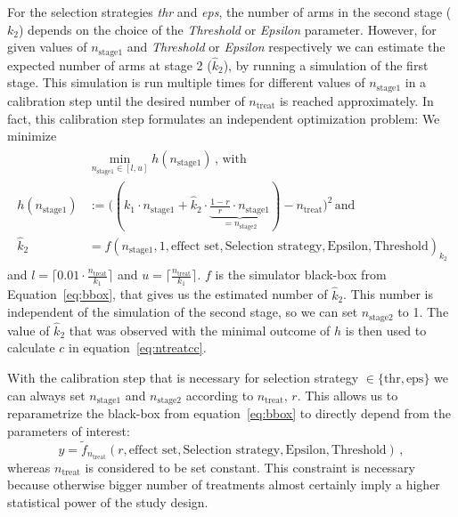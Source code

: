 \documentclass[bimj,fleqn]{w-art}
\theoremstyle{plain}
\theoremstyle{definition}
\begin{document}
For the selection strategies \emph{thr} and \emph{eps}, the number of arms in the second stage ($k_2$) depends on the choice of the \emph{Threshold} or \emph{Epsilon} parameter.
However, for given values of $n_{\text{stage1}}$ and \emph{Threshold} or \emph{Epsilon} respectively we can estimate the expected number of arms at stage 2 ($\hat{k}_2$), by running a simulation of the first stage.
This simulation is run multiple times for different values of $n_{\text{stage1}}$ in a calibration step until the desired number of $n_{\text{treat}}$ is reached approximately.
In fact, this calibration step formulates an independent optimization problem:
We minimize 
\begin{align}
  \label{eq:targettreat}
  \begin{split}
  & \operatorname{min}_{n_{\text{stage1}} \in [l,u]} h(n_{\text{stage1}}) \,  \text{, with} \\
  h(n_{\text{stage1}}) &:= \biggl( (k_1 \cdot n_{\text{stage1}} + \hat{k}_2 \cdot \underbrace{\frac{1-r}{r} \cdot n_{\text{stage1}}}_{=n_{\text{stage2}}}) - n_{\text{treat}} \biggr)^2 \, \text{and} \\
  \hat{k}_2 &= f(n_{\text{stage1}}, 1, \text{effect set}, \text{Selection strategy}, \text{Epsilon}, \text{Threshold})_{k_2}
  \end{split}
\end{align}
and $l = \lceil 0.01 \cdot \frac{n_{\text{treat}}}{k_1} \rceil$ and $u = \lceil \frac{n_{\text{treat}}}{k_1} \rceil$. 
$f$ is the simulator black-box from Equation~\ref{eq:bbox}, that gives us the estimated number of $\hat{k}_2$.
This number is independent of the simulation of the second stage, so we can set $n_{\text{stage2}}$ to 1.
The value of $\hat{k}_2$ that was observed with the minimal outcome of $h$ is then used to calculate $c$ in equation~\ref{eq:ntreatcc}.

With the calibration step that is necessary for selection strategy $\in \{\text{thr}, \text{eps} \}$ we can always set $n_{\text{stage1}}$ and $n_{\text{stage2}}$ according to $n_{\text{treat}}$, $r$.
This allows us to reparametrize the black-box from equation~\ref{eq:bbox} to directly depend from the parameters of interest:
\begin{equation}
  y = \tilde{f}_{n_{\text{treat}}}(r, \text{effect set}, \text{Selection strategy}, \text{Epsilon}, \text{Threshold}) \, ,
\end{equation}
whereas $n_{\text{treat}}$ is considered to be set constant.
This constraint is necessary because otherwise bigger number of treatments almost certainly imply a higher statistical power of the study design.
\end{document}
